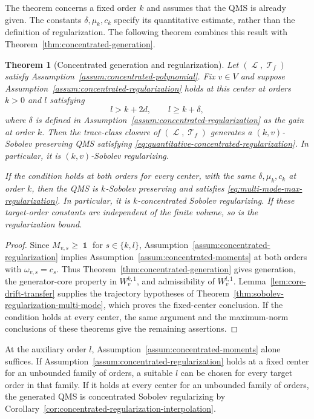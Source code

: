 \documentclass[11pt]{article}
\theoremstyle{myplain}
\newtheorem{thm}{Theorem}[section]
\theoremstyle{mydefinition}
\theoremstyle{remark}
\DeclareMathOperator{\cL}{\mathcal{L}}
\DeclareMathOperator{\cT}{\mathcal{T}}
\DeclareMathOperator{\1}{\mathds{1}}
\begin{document}
        The theorem concerns a fixed order $k$ and assumes that the QMS is already given. The constants $\delta,\mu_k,c_k$ specify its quantitative estimate, rather than the definition of regularization. The following theorem combines this result with Theorem~\ref{thm:concentrated-generation}.

        \begin{thm}[Concentrated generation and regularization]\label{thm:concentrated-generation-regularization}
            Let $(\cL,\cT_f)$ satisfy Assumption~\ref{assum:concentrated-polynomial}. Fix $v \in V$ and suppose Assumption~\ref{assum:concentrated-regularization} holds at this center at orders $k > 0$ and $l$ satisfying
            \begin{equation}\label{eq:regularization-auxiliary-order}
                l > k + 2d,\qquad l \geq k + \delta,
            \end{equation}
            where $\delta$ is defined in Assumption~\ref{assum:concentrated-regularization} as the gain at order $k$. Then the trace-class closure of $(\cL,\cT_f)$ generates a $(k,v)$-Sobolev preserving QMS satisfying \eqref{eq:quantitative-concentrated-regularization}. In particular, it is $(k,v)$-Sobolev regularizing.

            If the condition holds at both orders for every center, with the same $\delta,\mu_k,c_k$ at order $k$, then the QMS is $k$-Sobolev preserving and satisfies \eqref{eq:multi-mode-max-regularization}. In particular, it is $k$-concentrated Sobolev regularizing. If these target-order constants are independent of the finite volume, so is the regularization bound.
        \end{thm}
        \begin{proof}
            Since $M_{v,s} \geq \1$ for $s \in \{k,l\}$, Assumption~\ref{assum:concentrated-regularization} implies Assumption~\ref{assum:concentrated-moments} at both orders with $\omega_{v,s} = c_s$. Thus Theorem~\ref{thm:concentrated-generation} gives generation, the generator-core property in $W_v^{k,1}$, and admissibility of $W_v^{l,1}$. Lemma~\ref{lem:core-drift-transfer} supplies the trajectory hypotheses of Theorem~\ref{thm:sobolev-regularization-multi-mode}, which proves the fixed-center conclusion. If the condition holds at every center, the same argument and the maximum-norm conclusions of these theorems give the remaining assertions.
        \end{proof}
        At the auxiliary order $l$, Assumption~\ref{assum:concentrated-moments} alone suffices. If Assumption~\ref{assum:concentrated-regularization} holds at a fixed center for an unbounded family of orders, a suitable $l$ can be chosen for every target order in that family. If it holds at every center for an unbounded family of orders, the generated QMS is concentrated Sobolev regularizing by Corollary~\ref{cor:concentrated-regularization-interpolation}.
\end{document}
